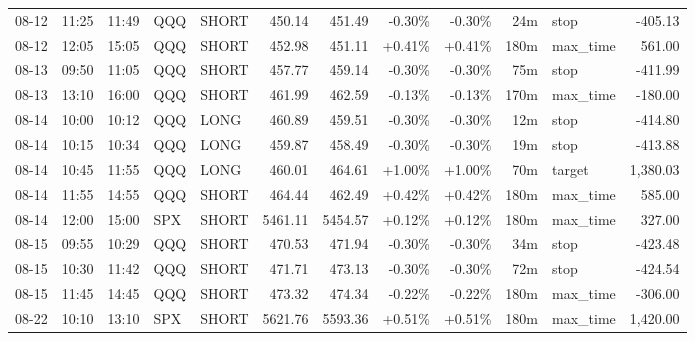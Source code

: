 \documentclass[11pt,a4paper,twoside]{article}
\begin{document}
\begin{center}
\begin{longtable}{>{\color{txtmain}}l l l l l r r r r r >{\color{txtmain}}l r}
08-12 & 11:25 & 11:49 & QQQ & SHORT & 450.14 & 451.49 & \textcolor{lossred}{-0.30\%} & \textcolor{lossred}{-0.30\%} & 24m & stop & \textcolor{lossred}{-405.13} \\
08-12 & 12:05 & 15:05 & QQQ & SHORT & 452.98 & 451.11 & \textcolor{wingreen}{+0.41\%} & \textcolor{wingreen}{+0.41\%} & 180m & max\_time & \textcolor{wingreen}{561.00} \\
08-13 & 09:50 & 11:05 & QQQ & SHORT & 457.77 & 459.14 & \textcolor{lossred}{-0.30\%} & \textcolor{lossred}{-0.30\%} & 75m & stop & \textcolor{lossred}{-411.99} \\
08-13 & 13:10 & 16:00 & QQQ & SHORT & 461.99 & 462.59 & \textcolor{lossred}{-0.13\%} & \textcolor{lossred}{-0.13\%} & 170m & max\_time & \textcolor{lossred}{-180.00} \\
08-14 & 10:00 & 10:12 & QQQ & LONG & 460.89 & 459.51 & \textcolor{lossred}{-0.30\%} & \textcolor{lossred}{-0.30\%} & 12m & stop & \textcolor{lossred}{-414.80} \\
08-14 & 10:15 & 10:34 & QQQ & LONG & 459.87 & 458.49 & \textcolor{lossred}{-0.30\%} & \textcolor{lossred}{-0.30\%} & 19m & stop & \textcolor{lossred}{-413.88} \\
08-14 & 10:45 & 11:55 & QQQ & LONG & 460.01 & 464.61 & \textcolor{wingreen}{+1.00\%} & \textcolor{wingreen}{+1.00\%} & 70m & target & \textcolor{wingreen}{1,380.03} \\
08-14 & 11:55 & 14:55 & QQQ & SHORT & 464.44 & 462.49 & \textcolor{wingreen}{+0.42\%} & \textcolor{wingreen}{+0.42\%} & 180m & max\_time & \textcolor{wingreen}{585.00} \\
08-14 & 12:00 & 15:00 & SPX & SHORT & 5461.11 & 5454.57 & \textcolor{wingreen}{+0.12\%} & \textcolor{wingreen}{+0.12\%} & 180m & max\_time & \textcolor{wingreen}{327.00} \\
08-15 & 09:55 & 10:29 & QQQ & SHORT & 470.53 & 471.94 & \textcolor{lossred}{-0.30\%} & \textcolor{lossred}{-0.30\%} & 34m & stop & \textcolor{lossred}{-423.48} \\
08-15 & 10:30 & 11:42 & QQQ & SHORT & 471.71 & 473.13 & \textcolor{lossred}{-0.30\%} & \textcolor{lossred}{-0.30\%} & 72m & stop & \textcolor{lossred}{-424.54} \\
08-15 & 11:45 & 14:45 & QQQ & SHORT & 473.32 & 474.34 & \textcolor{lossred}{-0.22\%} & \textcolor{lossred}{-0.22\%} & 180m & max\_time & \textcolor{lossred}{-306.00} \\
08-22 & 10:10 & 13:10 & SPX & SHORT & 5621.76 & 5593.36 & \textcolor{wingreen}{+0.51\%} & \textcolor{wingreen}{+0.51\%} & 180m & max\_time & \textcolor{wingreen}{1,420.00} \\

\end{longtable}
\end{center}
\end{document}
